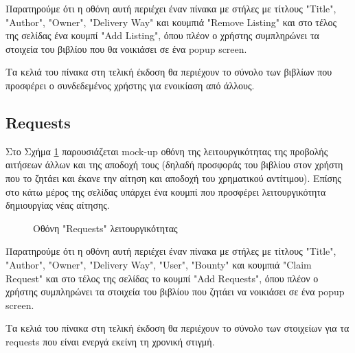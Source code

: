 \documentclass[12pt,a4paper]{article}
\begin{document}
Παρατηρούμε ότι η οθόνη αυτή περιέχει έναν πίνακα με στήλες με τίτλους "Title", "Author", "Owner", "Delivery Way" και κουμπιά "Remove Listing" και στο τέλος της σελίδας ένα κουμπί "Add Listing", όπου πλέον ο χρήστης συμπληρώνει τα στοιχεία του βιβλίου που θα νοικιάσει σε ένα popup screen.

Τα κελιά του πίνακα στη τελική έκδοση θα περιέχουν το σύνολο των βιβλίων που προσφέρει ο συνδεδεμένος χρήστης για ενοικίαση από άλλους.

\subsection{Requests}

Στο Σχήμα \ref{Οθόνη "Requests" λειτουργικότητας} παρουσιάζεται mock-up οθόνη της λειτουργικότητας της προβολής αιτήσεων άλλων και της αποδοχή τους (δηλαδή προσφοράς του βιβλίου στον χρήστη που το ζητάει και έκανε την αίτηση και αποδοχή του χρηματικού αντίτιμου). Επίσης στο κάτω μέρος της σελίδας υπάρχει ένα κουμπί που προσφέρει λειτουργικότητα δημιουργίας νέας αίτησης.

\begin{figure}[H]
	\caption{Οθόνη "Requests" λειτουργικότητας}
	\label{Οθόνη "Requests" λειτουργικότητας}
\end{figure}

Παρατηρούμε ότι η οθόνη αυτή περιέχει έναν πίνακα με στήλες με τίτλους "Title", "Author", "Owner", "Delivery Way", "User", "Bounty" και κουμπιά "Claim Request" και στο τέλος της σελίδας το κουμπί "Add Requests", όπου πλέον ο χρήστης συμπληρώνει τα στοιχεία του βιβλίου που ζητάει να νοικιάσει σε ένα popup screen.

Τα κελιά του πίνακα στη τελική έκδοση θα περιέχουν το σύνολο των στοιχείων για τα requests που είναι ενεργά εκείνη τη χρονική στιγμή.
\end{document}
